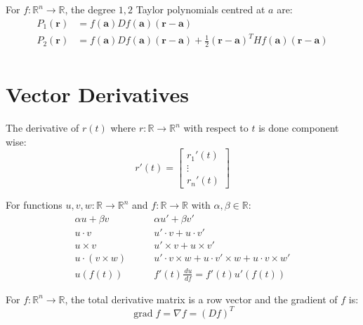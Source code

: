 \documentclass[a4paper, 11pt]{article}
\newcommand{\RR}{\mathbb{R}}
\def\dd#1#2{\frac{\,d#1}{\,d#2}}
\newenvironment{definition}[1][Definition.]{\begin{trivlist}
\item[\hskip \labelsep {\bfseries #1}]}{\end{trivlist}}
\newenvironment{example}[1][Example.]{\begin{trivlist}
\item[\hskip \labelsep {\bfseries #1}]}{\end{trivlist}}
\begin{document}
\begin{multicols}{2}
	\begin{definition}
		For $f:\RR^n\to\RR$, the degree $1,2$ Taylor polynomials centred at $a$ are:
		\begin{align*}
			P_1(\mathbf r) & = f(\mathbf a) Df(\mathbf a)(\mathbf r-\mathbf a)                                                                      \\
			P_2(\mathbf r) & = f(\mathbf a) Df(\mathbf a)(\mathbf r-\mathbf a) + \frac 12(\mathbf r-\mathbf a)^T Hf(\mathbf a)(\mathbf r-\mathbf a) \\
		\end{align*}
	\end{definition}


	\section*{Vector Derivatives}
	\begin{definition}
		The derivative of $r(t)$ where $r:\RR\to\RR^n$ with respect to $t$ is done component wise:
		$$r'(t)=\begin{bmatrix}
				r_1'(t) \\
				\vdots  \\
				r_n'(t)
			\end{bmatrix}$$
	\end{definition}


	\begin{example}
		For functions $u,v,w: \RR\to\RR^n$ and $f:\RR\to\RR$ with $\alpha,\beta\in\RR$:
		\begin{align*}
			\alpha u + \beta v & \qquad \alpha u' + \beta v'                                       \\
			u\cdot v           & \qquad u'\cdot v + u\cdot v'                                      \\
			u\times v          & \qquad u'\times v + u\times v'                                    \\
			u\cdot(v\times w)  & \qquad u'\cdot v\times w   +u\cdot v'\times w + u\cdot v\times w' \\
			u(f(t))            & \qquad f'(t)\dd uf = f'(t)u'(f(t))
		\end{align*}
	\end{example}

	For $f:\RR^n\to\RR$, the total derivative matrix is a row vector and the gradient of $f$ is:
	$$\operatorname{grad} f= \nabla f= (Df)^T$$



\end{multicols}
\end{document}
